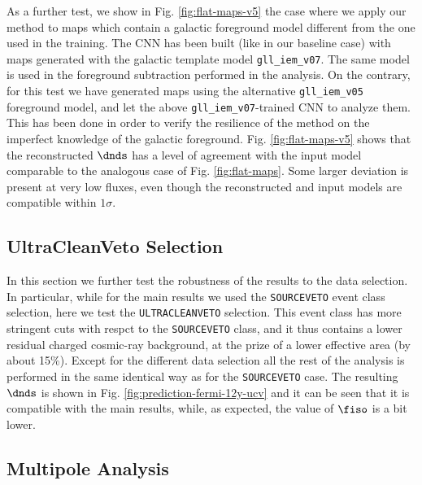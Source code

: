 As a further test, we show in Fig. \ref{fig:flat-maps-v5} the case where we apply our method to maps which contain a galactic foreground model different from the one used in the training. The CNN has been built (like in our baseline case) with maps generated with the galactic template model \verb|gll_iem_v07|. The same model is used in the foreground subtraction performed in the analysis. On the contrary, for this test we have generated maps  using the alternative \verb|gll_iem_v05| foreground model, and let the above \verb|gll_iem_v07|-trained CNN to analyze them. This has been done in order to verify the resilience of the method on the imperfect knowledge of the galactic foreground. Fig. \ref{fig:flat-maps-v5} shows that the reconstructed $\dnds$ has a level of agreement with the input model comparable to the analogous case of Fig. \ref{fig:flat-maps}. Some larger deviation is present at very low fluxes, even though the reconstructed and input models are compatible within $1\sigma$.




\subsection{UltraCleanVeto Selection} 


In this section we further test the robustness of the results to the \fermi data selection. In particular, while for the main results we used the {\tt SOURCEVETO} event class selection, here we test the {\tt ULTRACLEANVETO} selection. This event class has more stringent cuts with respct to the {\tt SOURCEVETO} class, and it thus contains a lower residual charged  cosmic-ray background, at the prize of a lower effective area (by about 15\%). Except for the different data selection all the rest of the analysis is performed in the same identical way as for the {\tt SOURCEVETO} case. The resulting $\dnds$ is shown in Fig. \ref{fig:prediction-fermi-12y-ucv} and it can be seen that it is compatible with the main results, while, as expected, the value of $\fiso$ is a bit lower. 



\subsection{Multipole Analysis}



